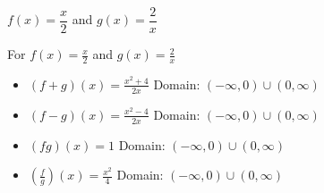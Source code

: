 {$f(x) = \dfrac{x}{2}$ and $g(x) = \dfrac{2}{x}$}
{For  $f(x) = \frac{x}{2}$ and $g(x) = \frac{2}{x}$

\begin{itemize}
\item $(f+g)(x) = \frac{x^2+4}{2x}$
      Domain: $(-\infty, 0) \cup (0, \infty)$
\item $(f-g)(x) = \frac{x^2-4}{2x}$
      Domain:  $(-\infty,0) \cup (0, \infty)$
\item $(fg)(x) = 1$
      Domain: $(-\infty,0) \cup (0, \infty)$
\item $\left(\frac{f}{g}\right)(x) = \frac{x^2}{4}$
      Domain: $(-\infty,0) \cup (0, \infty)$
\end{itemize}
}